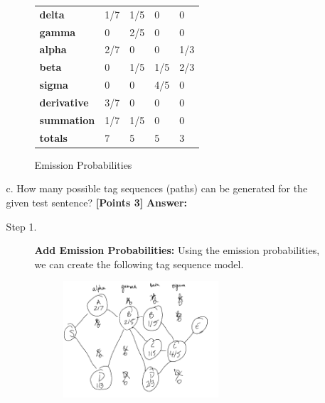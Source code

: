 \documentclass[12pt]{article}
\newcommand\tab[1][1cm]{\hspace*{#1}}
\newcommand\n{\newline}
\begin{document}
\begin{enumerate}
\begin{enumerate}
\begin{figure}[h]
\begin{tabular}{|l|l|l|l|l|}
                          \hline
                          \textbf{delta}      & 1/7 & 1/5 & 0   & 0   \\
                          \textbf{gamma}      & 0   & 2/5 & 0   & 0   \\
                          \textbf{alpha}      & 2/7 & 0   & 0   & 1/3 \\
                          \textbf{beta}       & 0   & 1/5 & 1/5 & 2/3 \\
                          \textbf{sigma}      & 0   & 0   & 4/5 & 0   \\
                          \textbf{derivative} & 3/7 & 0   & 0   & 0   \\
                          \textbf{summation}  & 1/7 & 1/5 & 0   & 0   \\
                          \textbf{totals}     & 7   & 5   & 5   & 3   \\
                          \hline
                      \end{tabular}
                      \caption{Emission Probabilities}
                  \end{figure}
                  \newpage
              \item[c.] How many  possible tag sequences (paths) can be
                  generated for the given test sentence? \textbf{[Points 3]}
                  \n\textbf{Answer:}\n\tab
                  \begin{description}
                      \item[Step 1.] \textbf{Add Emission Probabilities:} Using
                          the emission probabilities, we can create the following
                          tag sequence model.
                          \begin{figure}[h]
                              \centering
                              \includegraphics[width=0.65\textwidth]{assets/test1/emission1.png}

\end{figure}
\end{description}
\end{enumerate}
\end{enumerate}
\end{document}
